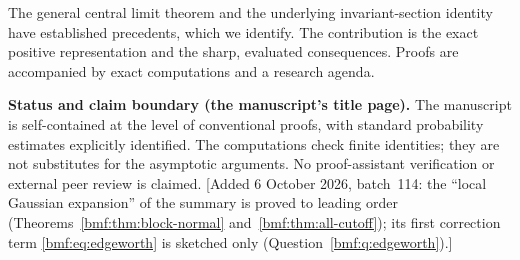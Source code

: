 \documentclass[11pt]{article}
\numberwithin{equation}{section}
\theoremstyle{definition}
\theoremstyle{remark}
\begin{document}
The general central limit theorem and the underlying invariant-section
identity have established precedents, which we identify. The contribution
is the exact positive representation and the sharp, evaluated
consequences. Proofs are accompanied by exact computations and a
research agenda.

\begin{statusbox}
\textbf{Status and claim boundary (the manuscript's title page).}
The manuscript is self-contained at the level of conventional proofs,
with standard probability estimates explicitly identified. The
computations check finite identities; they are not substitutes for
the asymptotic arguments. No proof-assistant verification or external
peer review is claimed.
[Added 6 October 2026, batch~114: the ``local Gaussian expansion'' of the
summary is proved to leading order (Theorems~\ref{bmf:thm:block-normal}
and~\ref{bmf:thm:all-cutoff}); its first correction term
\eqref{bmf:eq:edgeworth} is sketched only
(Question~\ref{bmf:q:edgeworth}).]
\end{statusbox}
\end{document}
